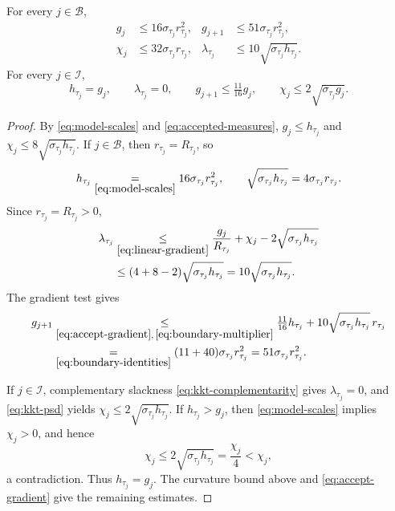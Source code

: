 \begin{lemma}\label{lem:geometry}
For every $j\in\mathcal B$,
\begin{equation}\label{eq:boundary}
 \begin{aligned}
 g_j&\le16\sigma_{\tau_j}r_{\tau_j}^2,&
 g_{j+1}&\le51\sigma_{\tau_j}r_{\tau_j}^2,\\
 \chi_j&\le32\sigma_{\tau_j}r_{\tau_j},&
 \lambda_{\tau_j}&\le10\sqrt{\sigma_{\tau_j}h_{\tau_j}}.
 \end{aligned}
\end{equation}
For every $j\in\mathcal I$,
\begin{equation}\label{eq:interior}
 h_{\tau_j}=g_j,\qquad \lambda_{\tau_j}=0,\qquad
 g_{j+1}\le\tfrac{11}{16}g_j,\qquad
 \chi_j\le2\sqrt{\sigma_{\tau_j}g_j}.
\end{equation}
\end{lemma}
\begin{proof}
By \eqref{eq:model-scales} and \eqref{eq:accepted-measures},
$g_j\le h_{\tau_j}$ and
$\chi_j\le8\sqrt{\sigma_{\tau_j}h_{\tau_j}}$.
If $j\in\mathcal B$, then $r_{\tau_j}=R_{\tau_j}$, so
\begin{equation}\label{eq:boundary-identities}
 h_{\tau_j}\underset{\eqref{eq:model-scales}}{=}16\sigma_{\tau_j}r_{\tau_j}^2,
 \qquad \sqrt{\sigma_{\tau_j}h_{\tau_j}}
       =4\sigma_{\tau_j}r_{\tau_j}.
\end{equation}
Since $r_{\tau_j}=R_{\tau_j}>0$,
\begin{equation}\label{eq:boundary-multiplier}
 \begin{aligned}
 \lambda_{\tau_j}
 &\underset{\eqref{eq:linear-gradient}}{\le}
       \frac{g_j}{R_{\tau_j}}+\chi_j
       -2\sqrt{\sigma_{\tau_j}h_{\tau_j}}\\
 &\le
       (4+8-2)\sqrt{\sigma_{\tau_j}h_{\tau_j}}
       =10\sqrt{\sigma_{\tau_j}h_{\tau_j}}.
 \end{aligned}
\end{equation}
The gradient test gives
\[
 \begin{aligned}
 g_{j+1}&\underset{\eqref{eq:accept-gradient},\,\eqref{eq:boundary-multiplier}}{\le}
       \tfrac{11}{16}h_{\tau_j}
       +10\sqrt{\sigma_{\tau_j}h_{\tau_j}}\,r_{\tau_j}\\
 &\underset{\eqref{eq:boundary-identities}}{=}
       (11+40)\sigma_{\tau_j}r_{\tau_j}^2
       =51\sigma_{\tau_j}r_{\tau_j}^2.
 \end{aligned}
\]

If $j\in\mathcal I$, complementary slackness
\eqref{eq:kkt-complementarity} gives $\lambda_{\tau_j}=0$, and
\eqref{eq:kkt-psd} yields $\chi_j\le2\sqrt{\sigma_{\tau_j}h_{\tau_j}}$.
If $h_{\tau_j}>g_j$, then \eqref{eq:model-scales} implies $\chi_j>0$,
and hence
\[
 \chi_j\le
 2\sqrt{\sigma_{\tau_j}h_{\tau_j}}
 =\frac{\chi_j}{4}<\chi_j,
\]
a contradiction. Thus $h_{\tau_j}=g_j$.
The curvature bound above and \eqref{eq:accept-gradient} give
the remaining estimates.
\end{proof}
